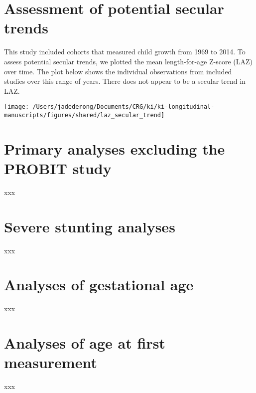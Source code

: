 \documentclass[9pt,]{book}
\begin{document}
\hypertarget{secular-trends}{%
\chapter{Assessment of potential secular trends}\label{secular-trends}}

\raggedright

This study included cohorts that measured child growth from 1969 to 2014. To assess potential secular trends, we plotted the mean length-for-age Z-score (LAZ) over time. The plot below shows the individual observations from included studies over this range of years. There does not appear to be a secular trend in LAZ.

\texttt{[image: /Users/jadederong/Documents/CRG/ki/ki-longitudinal-manuscripts/figures/shared/laz\_secular\_trend]}

\hypertarget{exclude-PROBIT}{%
\chapter{Primary analyses excluding the PROBIT study}\label{exclude-PROBIT}}

\raggedright

xxx

\hypertarget{severe-stunting}{%
\chapter{Severe stunting analyses}\label{severe-stunting}}

\raggedright

xxx

\hypertarget{gestational}{%
\chapter{Analyses of gestational age}\label{gestational}}

\raggedright

xxx

\hypertarget{age-meas}{%
\chapter{Analyses of age at first measurement}\label{age-meas}}

\raggedright

xxx


\end{document}
